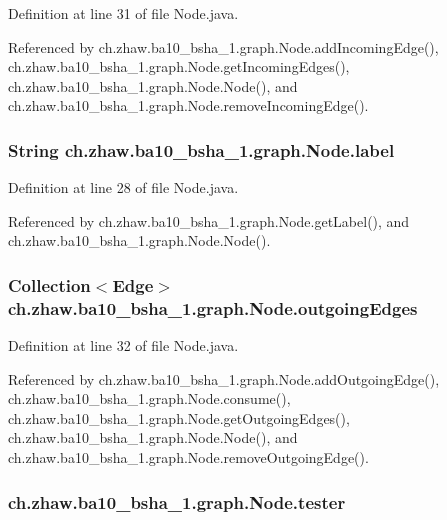 Definition at line 31 of file Node.java.

Referenced by ch.zhaw.ba10\_\-bsha\_\-1.graph.Node.addIncomingEdge(), ch.zhaw.ba10\_\-bsha\_\-1.graph.Node.getIncomingEdges(), ch.zhaw.ba10\_\-bsha\_\-1.graph.Node.Node(), and ch.zhaw.ba10\_\-bsha\_\-1.graph.Node.removeIncomingEdge().\hypertarget{classch_1_1zhaw_1_1ba10__bsha__1_1_1graph_1_1Node_a02527090afc270a47397d31fedb70375}{
\subsubsection[{label}]{\setlength{\rightskip}{0pt plus 5cm}String {\bf ch.zhaw.ba10\_\-bsha\_\-1.graph.Node.label}}}
\label{classch_1_1zhaw_1_1ba10__bsha__1_1_1graph_1_1Node_a02527090afc270a47397d31fedb70375}


Definition at line 28 of file Node.java.

Referenced by ch.zhaw.ba10\_\-bsha\_\-1.graph.Node.getLabel(), and ch.zhaw.ba10\_\-bsha\_\-1.graph.Node.Node().\hypertarget{classch_1_1zhaw_1_1ba10__bsha__1_1_1graph_1_1Node_a130b2d1b8b68b2fe91d3753b23c766e2}{
\subsubsection[{outgoingEdges}]{\setlength{\rightskip}{0pt plus 5cm}Collection$<${\bf Edge}$>$ {\bf ch.zhaw.ba10\_\-bsha\_\-1.graph.Node.outgoingEdges}}}
\label{classch_1_1zhaw_1_1ba10__bsha__1_1_1graph_1_1Node_a130b2d1b8b68b2fe91d3753b23c766e2}


Definition at line 32 of file Node.java.

Referenced by ch.zhaw.ba10\_\-bsha\_\-1.graph.Node.addOutgoingEdge(), ch.zhaw.ba10\_\-bsha\_\-1.graph.Node.consume(), ch.zhaw.ba10\_\-bsha\_\-1.graph.Node.getOutgoingEdges(), ch.zhaw.ba10\_\-bsha\_\-1.graph.Node.Node(), and ch.zhaw.ba10\_\-bsha\_\-1.graph.Node.removeOutgoingEdge().\hypertarget{classch_1_1zhaw_1_1ba10__bsha__1_1_1graph_1_1Node_abec03ba4df889f23c0d30d70edee59f6}{
\subsubsection[{tester}]{ {\bf ch.zhaw.ba10\_\-bsha\_\-1.graph.Node.tester}}}
\label{classch_1_1zhaw_1_1ba10__bsha__1_1_1graph_1_1Node_abec03ba4df889f23c0d30d70edee59f6}


